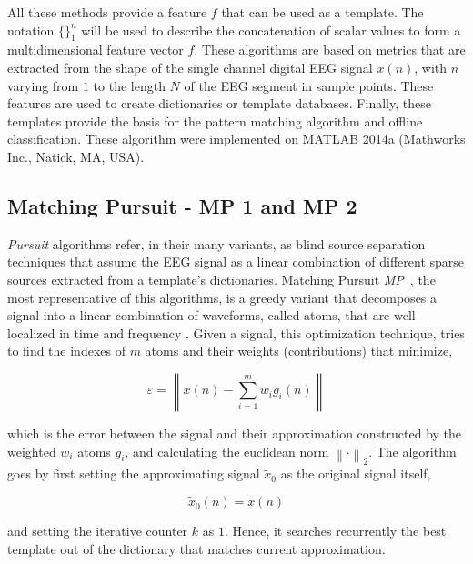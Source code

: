 \documentclass[brainsci,article,submit,moreauthors,pdftex,10pt,a4paper]{mdpi}
\begin{document}
All these methods provide a feature $ f $  that can be used as a template.  The notation $\{\}_{1}^{n} $ will be used to describe the concatenation of scalar values to form a multidimensional feature vector $f$. These algorithms are based on metrics that are extracted from the shape of the single channel digital EEG signal $x(n)$, with $n$ varying from $1$ to the length $N$ of the EEG segment in sample points.  These features are used to create dictionaries or template databases.  Finally, these templates provide the basis for the pattern matching algorithm and offline classification. These algorithm were implemented on MATLAB 2014a (Mathworks Inc., Natick, MA, USA). 

\subsection{Matching Pursuit - MP 1 and MP 2}

\textit{Pursuit} algorithms refer, in their many variants, as blind source separation \citep{Vincent2010} techniques that assume the EEG signal as a linear combination of different sparse sources extracted from a template's dictionaries.  Matching Pursuit \textit{MP}~\citep{Mallat1993}, the most representative of this algorithms, is a greedy variant that decomposes a signal into a linear combination of waveforms, called atoms, that are well localized in time and frequency \citep{ChandranKS2016}.  Given a signal, this optimization technique, tries to find the indexes of $m$ atoms and their weights (contributions) that minimize,


\begin{equation}
\varepsilon =  \left\lVert   x(n) - \sum_{i=1}^{m} w_i g_{i}(n)   \right\rVert
\label{eq:mperror}
\end{equation}

\noindent which is the error between the signal and their approximation constructed by the weighted $w_i$ atoms $g_{i}$, and calculating the euclidean norm ${\left\lVert \cdot \right\rVert}_{2}$.  The algorithm goes by first setting the approximating signal $\tilde{x}_{0}$  as the original signal itself,  

\begin{equation}
\tilde{x}_{0}(n) = x(n)
\label{eq:mp2}
\end{equation}

\noindent and setting the iterative counter $k$ as $1$. Hence, it searches recurrently the best template out of the dictionary  that matches current approximation.  
\end{document}
